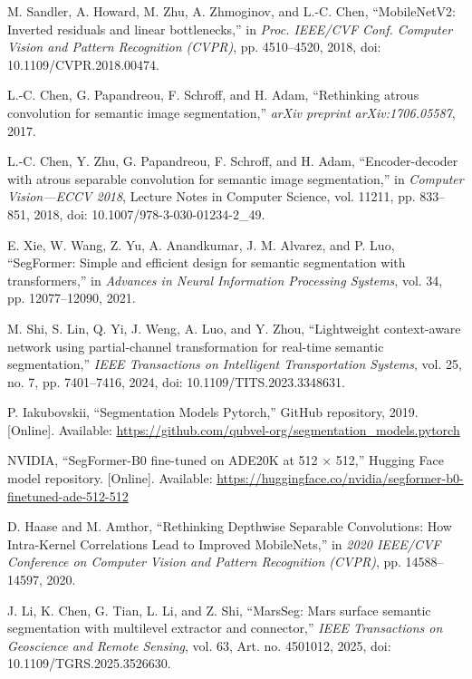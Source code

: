 M. Sandler, A. Howard, M. Zhu, A. Zhmoginov, and L.-C. Chen,
``MobileNetV2: Inverted residuals and linear bottlenecks,''
in \emph{Proc. IEEE/CVF Conf. Computer Vision and Pattern Recognition (CVPR)},
pp. 4510--4520, 2018,
doi: 10.1109/CVPR.2018.00474.

L.-C. Chen, G. Papandreou, F. Schroff, and H. Adam,
``Rethinking atrous convolution for semantic image segmentation,''
\emph{arXiv preprint arXiv:1706.05587}, 2017.

L.-C. Chen, Y. Zhu, G. Papandreou, F. Schroff, and H. Adam,
``Encoder-decoder with atrous separable convolution for semantic image segmentation,''
in \emph{Computer Vision---ECCV 2018},
Lecture Notes in Computer Science, vol. 11211,
pp. 833--851, 2018,
doi: 10.1007/978-3-030-01234-2\_49.

E. Xie, W. Wang, Z. Yu, A. Anandkumar, J. M. Alvarez, and P. Luo,
``SegFormer: Simple and efficient design for semantic segmentation with transformers,''
in \emph{Advances in Neural Information Processing Systems},
vol. 34, pp. 12077--12090, 2021.

M. Shi, S. Lin, Q. Yi, J. Weng, A. Luo, and Y. Zhou,
``Lightweight context-aware network using partial-channel transformation
for real-time semantic segmentation,''
\emph{IEEE Transactions on Intelligent Transportation Systems},
vol. 25, no. 7, pp. 7401--7416, 2024,
doi: 10.1109/TITS.2023.3348631.

P. Iakubovskii,
``Segmentation Models Pytorch,''
GitHub repository, 2019.
    [Online]. Available:
\url{https://github.com/qubvel-org/segmentation_models.pytorch}

NVIDIA,
``SegFormer-B0 fine-tuned on ADE20K at 512 \(\times\) 512,''
Hugging Face model repository.
    [Online]. Available:
\url{https://huggingface.co/nvidia/segformer-b0-finetuned-ade-512-512}

D. Haase and M. Amthor,
``Rethinking Depthwise Separable Convolutions: How Intra-Kernel
Correlations Lead to Improved MobileNets,''
in \emph{2020 IEEE/CVF Conference on Computer Vision and Pattern
    Recognition (CVPR)}, pp. 14588--14597, 2020.

J. Li, K. Chen, G. Tian, L. Li, and Z. Shi,
``MarsSeg: Mars surface semantic segmentation with multilevel
extractor and connector,''
\emph{IEEE Transactions on Geoscience and Remote Sensing},
vol. 63, Art. no. 4501012, 2025,
doi: 10.1109/TGRS.2025.3526630.

